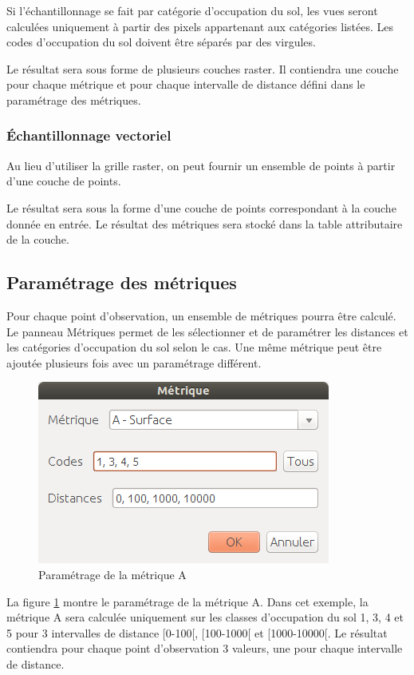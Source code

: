 \documentclass{report}
\begin{document}
Si l'échantillonnage se fait par catégorie d'occupation du sol, les vues seront calculées uniquement à partir des pixels appartenant aux catégories listées. Les codes d'occupation du sol doivent être séparés par des virgules.

Le résultat sera sous forme de plusieurs couches raster. Il contiendra une couche pour chaque métrique et pour chaque intervalle de distance défini dans le paramétrage des métriques.

\subsubsection{Échantillonnage vectoriel}
Au lieu d'utiliser la grille raster, on peut fournir un ensemble de points à partir d'une couche de points.

Le résultat sera sous la forme d'une couche de points correspondant à la couche donnée en entrée. Le résultat des métriques sera stocké dans la table attributaire de la couche.


\subsection{Paramétrage des métriques}
\label{param_metrics}
Pour chaque point d'observation, un ensemble de métriques pourra être calculé. Le panneau Métriques permet de les sélectionner et de paramétrer les distances et les catégories d'occupation du sol selon le cas. Une même métrique peut être ajoutée plusieurs fois avec un paramétrage différent.

\begin{figure}[H]
	\includegraphics[scale=0.5]{img/metric_param-fr.png} 
	\caption{Paramétrage de la métrique A}
	\label{metric_param_dlg}
\end{figure}

La figure \ref{metric_param_dlg} montre le paramétrage de la métrique A. Dans cet exemple, la métrique A sera calculée uniquement sur les classes d'occupation du sol 1, 3, 4 et 5 pour 3 intervalles de distance [0-100[, [100-1000[ et [1000-10000[. Le résultat contiendra pour chaque point d'observation 3 valeurs, une pour chaque intervalle de distance.
\end{document}
